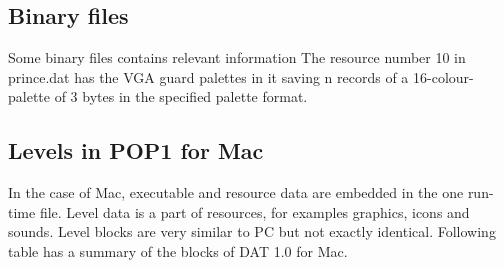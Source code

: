\documentclass{article}
\begin{document}



\subsection{Binary files \label{binary files}}
 Some binary files contains relevant information
 The resource number 10 in prince.dat has the  VGA guard palettes in it
 saving n records of a 16-colour-palette of 3 bytes in the specified
 palette format.

\subsection{Levels in POP1 for Mac}
 In the case of Mac, executable and resource data are embedded in the 
 one run-time file. Level data is a part of resources, for examples
 graphics, icons and sounds. Level blocks are very similar to PC but
 not exactly identical. Following table has a summary of the blocks of
 DAT 1.0 for Mac.
\pagebreak[3]
 
\end{document}
